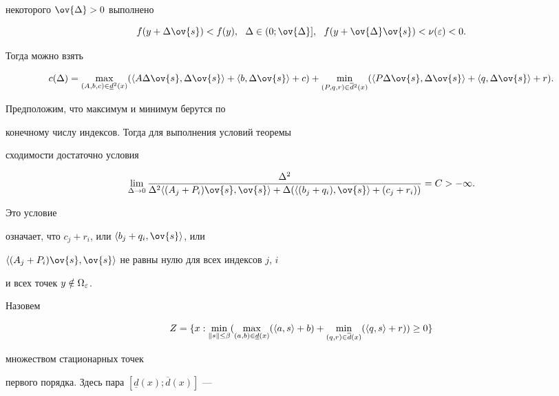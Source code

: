 некоторого $\ov{\Delta}>0$ выполнено


$$


f(y + \Delta \ov{s}) <


f(y), \ \ \Delta \in (0;\ov{\Delta}], \ \ f(y + \ov{\Delta}


\ov{s}) < \nu (\e) <0.


$$


Тогда можно взять


$$


c(\Delta) =


\max_{(A,b,c) \in \underline{d}^2 (x)} ( \la A \Delta \ov{s}, \Delta


\ov{s}\ra + \la b,\Delta \ov{s}\ra + c) + \min_{(P,q,r) \in


\overline{d}{}^2 (x)} (\la P \Delta \ov{s},\Delta \ov{s}\ra+ \la q, \Delta


\ov{s}\ra + r).


$$


Предположим, что максимум и минимум берутся по


конечному числу индексов. Тогда для выполнения условий теоремы


сходимости достаточно условия


$$


\lim_{\Delta \rar 0}


\frac{\Delta^2}{ \Delta^2 \la(A_j+P_i) \ov{s}, \ov{s}\ra + \Delta


(\la(b_j+q_i), \ov{s}\ra + (c_j+r_i))} = C > -\infty.


$$


Это условие


означает, что $c_j+r_i$, или $\la b_j+q_i, \ov{s}\ra$, или


$\la(A_j+P_i) \ov{s},\ov{s}\ra$ не равны нулю для всех индексов $j$, $i$


и всех точек $y \notin \Omega_{\varepsilon}$.





Назовем 


$$


Z = \{x: \min_{\|s\| \leq \beta} (\max_{(a,b)


\in \underline{d} (x)} ( \la a,s\ra + b) + \min_{(q,r) \in \overline{d}


(x)} (\la q,s\ra + r))  \geq 0 \}


$$


множеством стационарных точек


первого порядка. Здесь пара $[\underline{d}(x);\overline{d} (x)]$ ---


